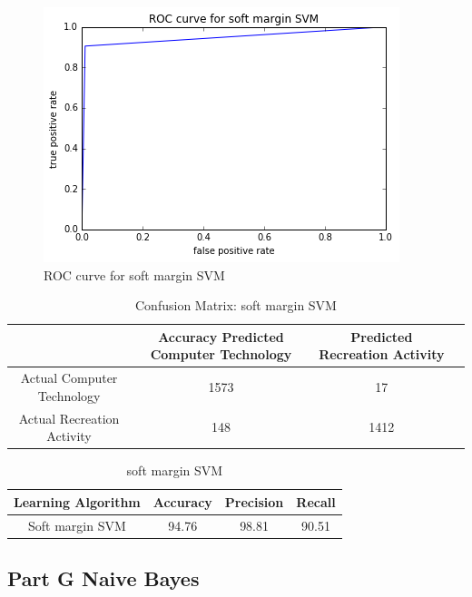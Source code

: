 \documentclass[11pt]{article}
\begin{document}
\begin{figure}[H]
	
	\includegraphics[width=\textwidth]{ROC_SMSVM.png}
	\caption{ROC curve for soft margin SVM}
\end{figure}

\begin{table}[h]
	\centering
	\begin{tabular}{|c|c|c|c|} \hline
		& Accuracy 		Predicted Computer Technology & Predicted Recreation Activity \\ \hline
		Actual Computer Technology & 1573 & 17 \\
		Actual Recreation Activity & 148& 1412  \\
		\hline
	\end{tabular}
	\caption{Confusion Matrix: soft margin SVM}
	\label{table:ovr_res}
\end{table}

\begin{table}[h]
	\centering
	\begin{tabular}{|c|c|c|c|} \hline
		Learning Algorithm & Accuracy & Precision & Recall\\ \hline
		Soft margin SVM & 94.76 & 98.81 & 90.51 \\
		\hline
	\end{tabular}
	\caption{soft margin SVM}
	\label{table:ovr_res}
\end{table}

\subsection{Part G Naive Bayes}
\end{document}
